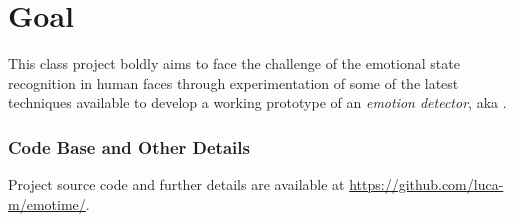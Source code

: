 \section{Goal}

This class project boldly aims to face the challenge of the emotional state recognition in human faces through experimentation of some of the latest techniques available to develop a working prototype of an \emph{emotion detector}, aka .

\subsubsection*{Code Base and Other Details}

Project source code and further details are available at \url{https://github.com/luca-m/emotime/}.
